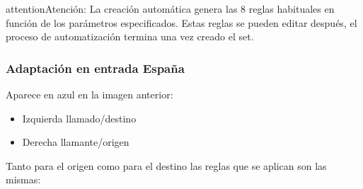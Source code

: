 \documentclass[letterpaper,10pt,spanish]{sphinxmanual}
\begin{document}
\begin{notice}{attention}{Atención:}
La creación automática genera las 8 reglas habituales en función de los parámetros especificados. Estas reglas se pueden editar después, el proceso de automatización termina una vez creado el set.
\end{notice}


\subsubsection{Adaptación en entrada España}
\label{external_incoming_calls/numeric_transformations:spanish-incoming-transformation}
Aparece en azul en la imagen anterior:
\begin{itemize}
\item {} 
Izquierda llamado/destino

\item {} 
Derecha llamante/origen

\end{itemize}

Tanto para el origen como para el destino las reglas que se aplican son las mismas:
\end{document}
